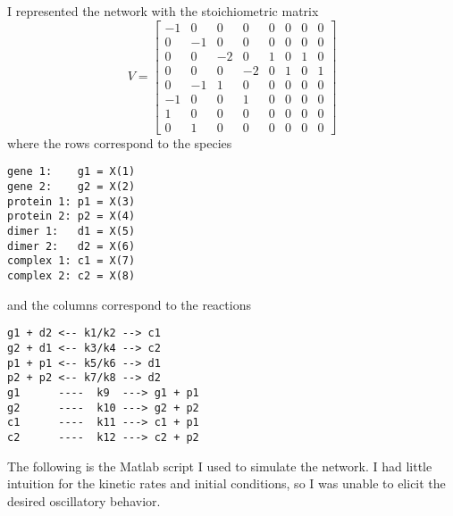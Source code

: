 \documentclass[a4paper, 10pt]{article}
\begin{document}
I represented the network with the stoichiometric matrix
\[ 
V = \begin{bmatrix}
-1 & 0 & 0 & 0 & 0 & 0 & 0 & 0 \\
0 & -1 & 0 & 0 & 0 & 0 & 0 & 0 \\
0 & 0 & -2 & 0 & 1 & 0 & 1 & 0 \\
0 & 0 & 0 & -2 & 0 & 1 & 0 & 1 \\
0 & -1 & 1 & 0 & 0 & 0 & 0 & 0 \\
-1 & 0 & 0 & 1 & 0 & 0 & 0 & 0 \\
1 & 0 & 0 & 0 & 0 & 0 & 0 & 0  \\
0 & 1 & 0 & 0 & 0 & 0 & 0 & 0
\end{bmatrix}
\]
where the rows correspond to the species
\begin{verbatim}
gene 1:    g1 = X(1)
gene 2:    g2 = X(2)
protein 1: p1 = X(3)
protein 2: p2 = X(4)
dimer 1:   d1 = X(5)
dimer 2:   d2 = X(6)
complex 1: c1 = X(7)
complex 2: c2 = X(8)
\end{verbatim}
and the columns correspond to the reactions
\begin{verbatim}
g1 + d2 <-- k1/k2 --> c1
g2 + d1 <-- k3/k4 --> c2
p1 + p1 <-- k5/k6 --> d1
p2 + p2 <-- k7/k8 --> d2
g1      ----  k9  ---> g1 + p1
g2      ----  k10 ---> g2 + p2
c1      ----  k11 ---> c1 + p1
c2      ----  k12 ---> c2 + p2
\end{verbatim}

The following is the Matlab script I used to simulate the network. I had little intuition for the kinetic rates and initial conditions, so I was unable to elicit the desired oscillatory behavior.
\end{document}
